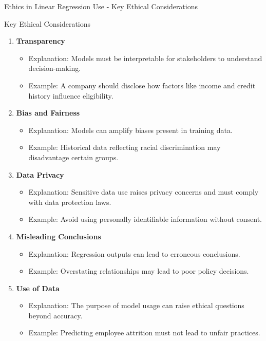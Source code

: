 \documentclass[aspectratio=169]{beamer}
\begin{document}
\begin{frame}[fragile]{Ethics in Linear Regression Use - Key Ethical Considerations}
    \begin{block}{Key Ethical Considerations}
        \begin{enumerate}
            \item \textbf{Transparency}  
                \begin{itemize}
                    \item Explanation: Models must be interpretable for stakeholders to understand decision-making.
                    \item Example: A company should disclose how factors like income and credit history influence eligibility.
                \end{itemize}
            \item \textbf{Bias and Fairness}  
                \begin{itemize}
                    \item Explanation: Models can amplify biases present in training data.
                    \item Example: Historical data reflecting racial discrimination may disadvantage certain groups.
                \end{itemize}
            \item \textbf{Data Privacy}  
                \begin{itemize}
                    \item Explanation: Sensitive data use raises privacy concerns and must comply with data protection laws.
                    \item Example: Avoid using personally identifiable information without consent.
                \end{itemize}
            \item \textbf{Misleading Conclusions} 
                \begin{itemize}
                    \item Explanation: Regression outputs can lead to erroneous conclusions.
                    \item Example: Overstating relationships may lead to poor policy decisions.
                \end{itemize}
            \item \textbf{Use of Data}  
                \begin{itemize}
                    \item Explanation: The purpose of model usage can raise ethical questions beyond accuracy.
                    \item Example: Predicting employee attrition must not lead to unfair practices.
                \end{itemize}
        \end{enumerate}
    \end{block}
\end{frame}
\end{document}
